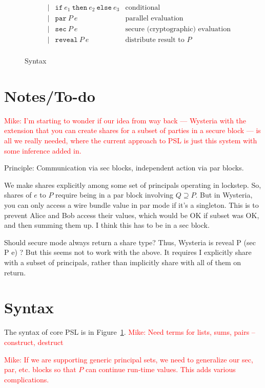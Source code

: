 \documentclass[10pt]{article}
\newcommand{\kw}[1]{\ensuremath{\mathtt{#1}}}
\newcommand{\epar}[2]{\ensuremath{\kw{par}~{#1}~{#2}}}
\newcommand{\esec}[2]{\ensuremath{\kw{sec}~{#1}~{#2}}}
\newcommand{\ereveal}[2]{\ensuremath{\kw{reveal}~{#1}~{#2}}}
\newcommand{\econd}[3]{\ensuremath{\kw{if}~{#1}~\kw{then}~{#2}~\kw{else}~{#3}}}
\newcommand{\mwh}[1]{\textcolor{red}{Mike: #1}}
\begin{document}
\begin{figure}[h]
\[\begin{array}{rlcll}
                       && \mid & \econd{e_1}{e_2}{e_3}  & \text{conditional} \\
                       && \mid & \epar{P}{e} & \text{parallel evaluation}\\
                       && \mid & \esec{P}{e} & \text{secure (cryptographic) evaluation}\\
                       && \mid & \ereveal{P}{e} & \text{distribute result to $P$}\\
  \end{array}
  \]
  \caption{Syntax}
  \label{fig:syntax}
\end{figure}

\section{Notes/To-do}

\mwh{I'm starting to wonder if our idea from way back --- Wysteria with the
extension that you can create shares for a subset of parties in a
secure block --- is all we really needed, where the current approach
to PSL is just this system with some inference added in.}

Principle: Communication via sec blocks, independent action via par
blocks.

We make shares explicitly among some set of principals operating in
lockstep. So, shares of $e$ to $P$ require being in a par block
involving $Q \supseteq P$. But in Wysteria, you can only access a wire
bundle value in par mode if it's a singleton. This is to prevent Alice
and Bob access their values, which would be OK if subset was OK, and
then summing them up. I think this has to be in a sec block.

Should secure mode always return a share type? Thus, Wysteria is
reveal P (sec P e) ? But this seems not to work with the above. It
requires I explicitly share with a subset of principals, rather than
implicitly share with all of them on return.

\section{Syntax}

The syntax of core PSL is in Figure~\ref{fig:syntax}. \mwh{Need terms for
lists, sums, pairs -- construct, destruct}

\mwh{If we are supporting generic principal sets, we need to generalize our
sec, par, etc. blocks so that $P$ can continue run-time values. This
adds various complications.}
\end{document}
